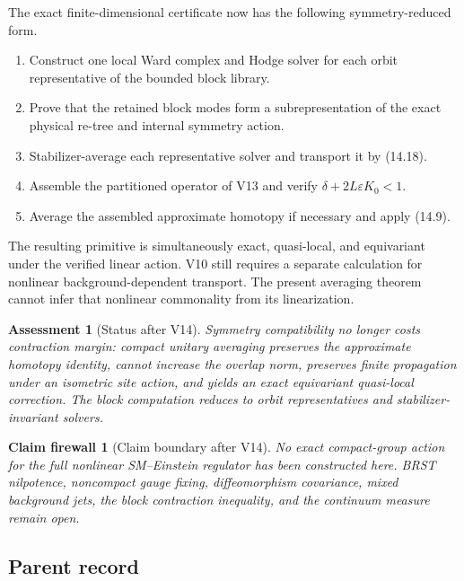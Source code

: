 \documentclass[11pt]{article}
\newtheorem{firewall}[theorem]{Claim firewall}
\newtheorem{assessment}[theorem]{Assessment}
\theoremstyle{remark}
\begin{document}
The exact finite-dimensional certificate now has the following
symmetry-reduced form.

\begin{enumerate}
\item Construct one local Ward complex and Hodge solver for each
      orbit representative of the bounded block library.
\item Prove that the retained block modes form a subrepresentation
      of the exact physical re-tree and internal symmetry action.
\item Stabilizer-average each representative solver and transport it
      by (14.18).
\item Assemble the partitioned operator of V13 and verify
      \(\delta+2L\varepsilon K_0<1\).
\item Average the assembled approximate homotopy if necessary and
      apply (14.9).
\end{enumerate}

The resulting primitive is simultaneously exact, quasi-local, and
equivariant under the verified linear action.  V10 still requires a
separate calculation for nonlinear background-dependent transport.
The present averaging theorem cannot infer that nonlinear
commonality from its linearization.

\begin{assessment}[Status after V14]
\label{ass:v12v14-status}
Symmetry compatibility no longer costs contraction margin: compact
unitary averaging preserves the approximate homotopy identity,
cannot increase the overlap norm, preserves finite propagation under
an isometric site action, and yields an exact equivariant
quasi-local correction.  The block computation reduces to orbit
representatives and stabilizer-invariant solvers.
\end{assessment}

\begin{firewall}[Claim boundary after V14]
\label{fire:v12v14-claim}
No exact compact-group action for the full nonlinear
SM--Einstein regulator has been constructed here.  BRST
nilpotence, noncompact gauge fixing, diffeomorphism covariance,
mixed background jets, the block contraction inequality, and the
continuum measure remain open.
\end{firewall}

\subsection{Parent record}
\end{document}
